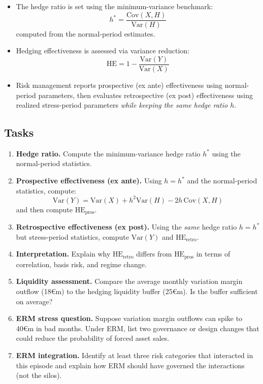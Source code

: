 \documentclass[11pt]{article}
\begin{document}
\begin{itemize}
  \item[$\bullet$] The hedge ratio is set using the minimum-variance benchmark:
  \[
  h^* = \frac{\mathrm{Cov}(X,H)}{\mathrm{Var}(H)}
  \]
  computed from the normal-period estimates.

  \item[$\bullet$] Hedging effectiveness is assessed via variance reduction:
  \[
  \text{HE} = 1 - \frac{\mathrm{Var}(Y)}{\mathrm{Var}(X)}
  \]

  \item[$\bullet$] Risk management reports prospective (ex ante) effectiveness
  using normal-period parameters, then evaluates retrospective (ex post)
  effectiveness using realized stress-period parameters \emph{while keeping the
  same hedge ratio $h$}.
\end{itemize}

\subsection*{Tasks}

\begin{enumerate}
  \item \textbf{Hedge ratio.} Compute the minimum-variance hedge ratio $h^*$
  using the normal-period statistics.

  \item \textbf{Prospective effectiveness (ex ante).}
  Using $h=h^*$ and the normal-period statistics, compute:
  \[
  \mathrm{Var}(Y) = \mathrm{Var}(X) + h^2\mathrm{Var}(H) - 2h\,\mathrm{Cov}(X,H)
  \]
  and then compute $\text{HE}_{\text{pros}}$.

  \item \textbf{Retrospective effectiveness (ex post).}
  Using the \emph{same} hedge ratio $h=h^*$ but stress-period statistics,
  compute $\mathrm{Var}(Y)$ and $\text{HE}_{\text{retro}}$.

  \item \textbf{Interpretation.}
  Explain why $\text{HE}_{\text{retro}}$ differs from $\text{HE}_{\text{pros}}$
  in terms of correlation, basis risk, and regime change.

  \item \textbf{Liquidity assessment.}
  Compare the average monthly variation margin outflow (18€m) to the hedging
  liquidity buffer (25€m). Is the buffer sufficient on average?

  \item \textbf{ERM stress question.}
  Suppose variation margin outflows can spike to 40€m in bad months.
  Under ERM, list two governance or design changes that could reduce the
  probability of forced asset sales.

  \item \textbf{ERM integration.}
  Identify at least three risk categories that interacted in this episode and
  explain how ERM should have governed the interactions (not the silos).
\end{enumerate}
\end{document}
